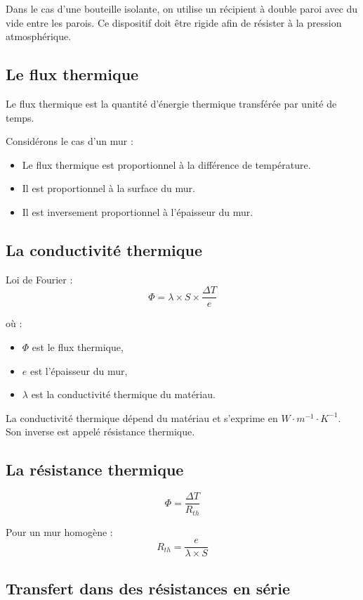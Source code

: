 \documentclass[11pt]{article}
\begin{document}
	Dans le cas d’une bouteille isolante, on utilise un récipient à double paroi avec du vide entre les parois.  
	Ce dispositif doit être rigide afin de résister à la pression atmosphérique.
	
	\subsection*{Le flux thermique}
	
	Le flux thermique est la quantité d’énergie thermique transférée par unité de temps.
	
	Considérons le cas d’un mur :
	\begin{itemize}
		\item Le flux thermique est proportionnel à la différence de température.
		\item Il est proportionnel à la surface du mur.
		\item Il est inversement proportionnel à l’épaisseur du mur.
	\end{itemize}
	
	\subsection*{La conductivité thermique}
	
	Loi de Fourier :
	\[
	\Phi = \lambda \times S \times \frac{\Delta T}{e}
	\]
	
	où :
	\begin{itemize}
		\item $\Phi$ est le flux thermique,
		\item $e$ est l’épaisseur du mur,
		\item $\lambda$ est la conductivité thermique du matériau.
	\end{itemize}
	
	La conductivité thermique dépend du matériau et s’exprime en $W \cdot m^{-1} \cdot K^{-1}$.  
	Son inverse est appelé résistance thermique.
	
	\subsection*{La résistance thermique}
	
	\[
	\Phi = \frac{\Delta T}{R_{th}}
	\]
	
	Pour un mur homogène :
	\[
	R_{th} = \frac{e}{\lambda \times S}
	\]
	
	\subsection*{Transfert dans des résistances en série}
	
\end{document}
